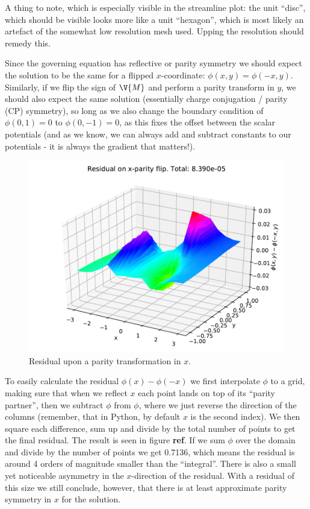 \documentclass[sigconf]{acmart}
\begin{document}
A thing to note, which is especially visible in the streamline plot: the unit ``disc'', which should be visible looks more like a unit ``hexagon'', which is most likely an artefact of the somewhat low resolution mesh used. Upping the resolution should remedy this.

Since the governing equation has reflective or parity symmetry we should expect the solution to be the same for a flipped $ x $-coordinate: $ \phi(x, y) = \phi(-x, y) $. Similarly, if we flip the sign of $ \V{M} $ and perform a parity transform in $ y $, we should also expect the same solution (essentially charge conjugation / parity (CP) symmetry), so long as we also change the boundary condition of $ \phi(0,1) =0 $ to $ \phi(0,-1)=0 $, as this fixes the offset between the scalar potentials (and as we know, we can always add and subtract constants to our potentials - it is always the gradient that matters!).
\begin{figure}
	\includegraphics[width=\linewidth]{ex_res_x.pdf}
	\caption{Residual upon a parity transformation in $ x $.}
	\label{fig:xres}
\end{figure}
To easily calculate the residual $ \phi(x)-\phi(-x) $ we first interpolate $ \phi $ to a grid, making sure that when we reflect $ x $ each point lands on top of its ``parity partner'', then we subtract $ \phi $ from $ \phi $, where we just reverse the direction of the columns (remember, that in Python, by default $ x $ is the second index). We then square each difference, sum up and divide by the total number of points to get the final residual. The result is seen in figure \textbf{ref}. If we sum $ \phi $ over the domain and divide by the number of points we get 0.7136, which means the residual is around 4 orders of magnitude smaller than the ``integral''. There is also a small yet noticeable asymmetry in the $ x $-direction of the residual. With a residual of this size we still conclude, however, that there is at least approximate parity symmetry in $ x $ for the solution.
\end{document}
